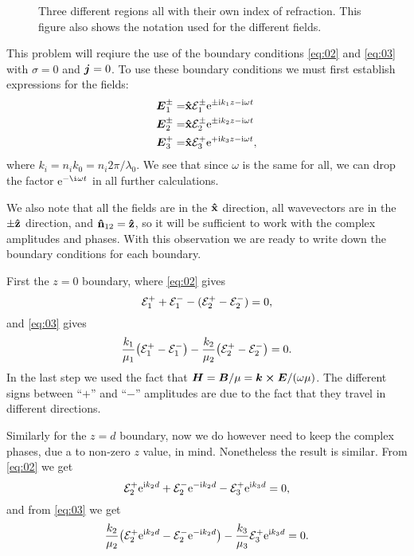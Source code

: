 \documentclass[11pt,letter, swedish, english
]{article}
\begin{document}
\begin{figure}
\centering
\resizebox{.6\textwidth}{!}{}
\caption{Three different regions all with their own index of
  refraction. This figure also shows the notation used for the
  different fields. }
\label{fig:1_geometry}
\end{figure}

This problem will reqiure the use of the boundary conditions
\eqref{eq:02} and \eqref{eq:03} with $\sigma=0$ and $\vb*j=0$. To use
these boundary conditions we must first establish expressions for the
fields:
\begin{equation}
\begin{aligned}
\vb*E_1^\pm=&\vu{x}\mathcal{E}_1^\pm\mathrm{e}^{\pm\mathrm{i} k_1z -\mathrm{i}\omega t}\\
\vb*E_2^\pm=&\vu{x}\mathcal{E}_2^\pm\mathrm{e}^{\pm\mathrm{i} k_2z -\mathrm{i}\omega t}\\
\vb*E_3^{+}=&\vu{x}\mathcal{E}_3^+\mathrm{e}^{+\mathrm{i} k_3z -\mathrm{i}\omega t},
\end{aligned}
\end{equation}
where $k_i=n_ik_0=n_i2\pi/\lambda_0$. We see that since $\omega$
is the same for all, we can drop the factor $\ee^{-\i\omega t}$ in all
further calculations. 

We also note that all the fields are in the $\vu{x}$ direction, all
wavevectors are in the $\pm\vu{z}$ direction, and
$\vu{n}_{12}=\vu{z}$, so it will be sufficient to work with the
complex amplitudes and phases. With this observation we are ready to
write down the boundary conditions for each boundary. 

First the $z=0$ boundary, where \eqref{eq:02} gives
\begin{equation}
{\mathcal{E}_1^+}+{\mathcal{E}_1^-} -({\mathcal{E}_2^+}-{\mathcal{E}_2^-}) =0, 
\end{equation}
and \eqref{eq:03} gives
\begin{equation}
\frac{k_1}{\mu_1}\qty({\mathcal{E}_1^+}-{\mathcal{E}_1^-}) 
-\frac{k_2}{\mu_2}\qty({\mathcal{E}_2^+}-{\mathcal{E}_2^-}) =0.
\end{equation}
In the last step we used the fact that 
$\vb*H = \vb*B/\mu = \vb*k\cross\vb*E/(\omega\mu)$. The different
signs between ``$+$'' and ``$-$'' amplitudes are due to the fact that
they travel in different directions. 

Similarly for the $z=d$ boundary, now we do however need to keep the
complex phases, due a to non-zero $z$ value, in mind. Nonetheless the
result is similar. From \eqref{eq:02} we get
\begin{equation}
{\mathcal{E}_2^+}\mathrm{e}^{\mathrm{i} k_2d}+{\mathcal{E}_2^-}\mathrm{e}^{-\mathrm{i} k_2d} -{\mathcal{E}_3^+}\mathrm{e}^{\mathrm{i} k_3d} =0, 
\end{equation}
and from \eqref{eq:03} we get
\begin{equation}
\frac{k_2}{\mu_2}\qty({\mathcal{E}_2^+}\mathrm{e}^{\mathrm{i} k_2d}-{\mathcal{E}_2^-}\mathrm{e}^{-\mathrm{i} k_2d}) 
-\frac{k_3}{\mu_3}{\mathcal{E}_3^+}\mathrm{e}^{\mathrm{i} k_3d} =0.
\end{equation}
\end{document}
